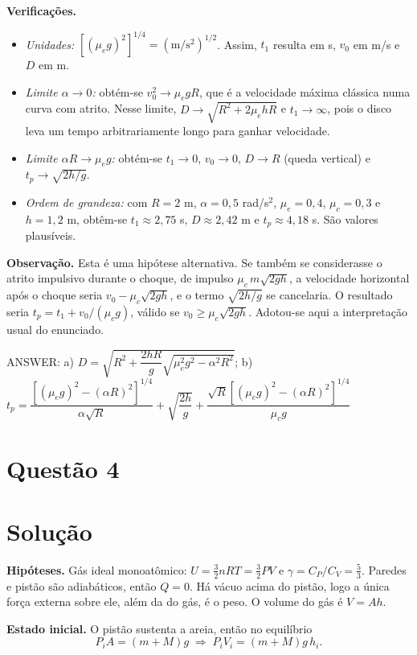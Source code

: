 \documentclass{article}%
\begin{document}
\textbf{Verificações.}
\begin{itemize}
\item \emph{Unidades:} $[(\mu_e g)^2]^{1/4}=(\mathrm{m/s^2})^{1/2}$. Assim, $t_1$ resulta em s, $v_0$ em m/s e $D$ em m.
\item \emph{Limite $\alpha\to 0$:} obtém-se $v_0^2\to\mu_e gR$, que é a velocidade máxima clássica numa curva com atrito. Nesse limite, $D\to\sqrt{R^2+2\mu_e hR}$ e $t_1\to\infty$, pois o disco leva um tempo arbitrariamente longo para ganhar velocidade.
\item \emph{Limite $\alpha R\to\mu_e g$:} obtém-se $t_1\to0$, $v_0\to0$, $D\to R$ (queda vertical) e $t_p\to\sqrt{2h/g}$.
\item \emph{Ordem de grandeza:} com $R=2$ m, $\alpha=0{,}5$ rad/s$^2$, $\mu_e=0{,}4$, $\mu_c=0{,}3$ e $h=1{,}2$ m, obtêm-se $t_1\approx2{,}75$ s, $D\approx2{,}42$ m e $t_p\approx4{,}18$ s. São valores plausíveis.
\end{itemize}

\textbf{Observação.} Esta é uma hipótese alternativa. Se também se considerasse o atrito impulsivo durante o choque, de impulso $\mu_c\,m\sqrt{2gh}$, a velocidade horizontal após o choque seria $v_0-\mu_c\sqrt{2gh}$, e o termo $\sqrt{2h/g}$ se cancelaria. O resultado seria $t_p=t_1+v_0/(\mu_c g)$, válido se $v_0\ge\mu_c\sqrt{2gh}$. Adotou-se aqui a interpretação usual do enunciado.

ANSWER: a) $D=\sqrt{R^2+\dfrac{2hR}{g}\sqrt{\mu_e^2g^2-\alpha^2R^2}}$; \quad b) $t_p=\dfrac{\left[(\mu_e g)^2-(\alpha R)^2\right]^{1/4}}{\alpha\sqrt{R}}+\sqrt{\dfrac{2h}{g}}+\dfrac{\sqrt{R}\left[(\mu_e g)^2-(\alpha R)^2\right]^{1/4}}{\mu_c g}$%
\newpage%
\section*{Questão 4}

\section*{Solução}

\textbf{Hipóteses.} Gás ideal monoatômico: $U=\tfrac32 nRT=\tfrac32 PV$ e $\gamma=C_P/C_V=\tfrac53$. Paredes e pistão são adiabáticos, então $Q=0$. Há vácuo acima do pistão, logo a única força externa sobre ele, além da do gás, é o peso. O volume do gás é $V=Ah$.

\textbf{Estado inicial.} O pistão sustenta a areia, então no equilíbrio
\[
P_iA=(m+M)g \;\Rightarrow\; P_iV_i=(m+M)g\,h_i .
\]
\end{document}
